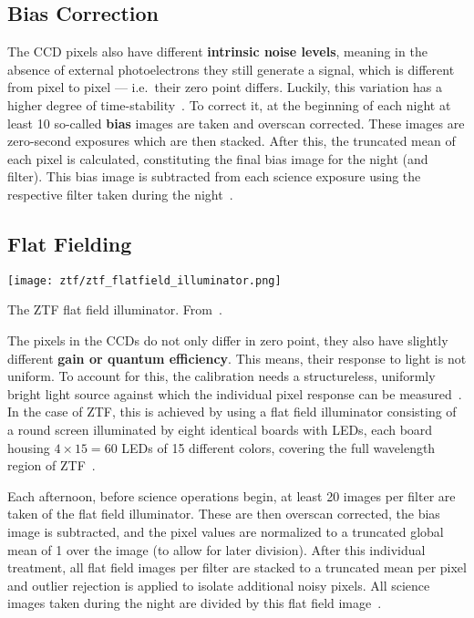 \subsection{Bias Correction}
The CCD pixels also have different \textbf{intrinsic noise levels}, meaning in the absence of external photoelectrons they still generate a signal, which is different from pixel to pixel --- i.e.\ their zero point differs. Luckily, this variation has a higher degree of time-stability~. To correct it, at the beginning of each night at least 10 so-called \textbf{bias} images are taken and overscan corrected. These images are zero-second exposures which are then stacked. After this, the truncated mean of each pixel is calculated, constituting the final bias image for the night (and filter). This bias image is subtracted from each science exposure using the respective filter taken during the night~\cite{Masci2019a}.

\subsection{Flat Fielding}

\begin{marginfigure}
    \texttt{[image: ztf/ztf\_flatfield\_illuminator.png]}
    \caption[ZTF flat field illuminator]{The ZTF flat field illuminator. From~\cite{Dekany2020}.}
\end{marginfigure}

The pixels in the CCDs do not only differ in zero point, they also have slightly different \textbf{gain or quantum efficiency}. This means, their response to light is not uniform. To account for this, the calibration needs a structureless, uniformly bright light source against which the individual pixel response can be measured~\cite{Howell2006}. In the case of ZTF, this is achieved by using a flat field illuminator consisting of a round screen illuminated by eight identical boards with LEDs, each board housing $4\times15=60$ LEDs of 15 different colors, covering the full wavelength region of ZTF~\cite{Dekany2020}.

Each afternoon, before science operations begin, at least 20 images per filter are taken of the flat field illuminator. These are then overscan corrected, the bias image is subtracted, and the pixel values are normalized to a truncated global mean of 1 over the image (to allow for later division). After this individual treatment, all flat field images per filter are stacked to a truncated mean per pixel and outlier rejection is applied to isolate additional noisy pixels. All science images taken during the night are divided by this flat field image~\cite{Masci2019a}.

